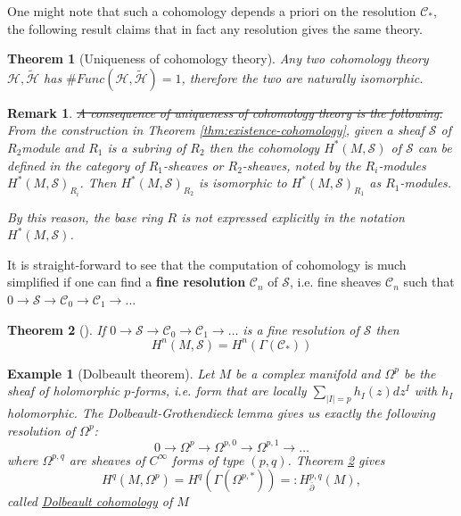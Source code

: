 \documentclass[11pt]{article}
\newtheorem{remark}{Remark}
\newtheorem{theorem}{Theorem}
\newtheorem{exampl}{Example}
\begin{document}
One might note that such a cohomology depends a priori on the resolution \(\mathcal{C}_*\), the following result claims that in fact any resolution gives the same theory.

\begin{theorem}[Uniqueness of cohomology theory]
\label{thm:uniqueness-cohomology}
Any two cohomology theory \(\mathcal{H}, \tilde{\mathcal{H}}\) has \(\#Func(\mathcal{H},
\tilde{\mathcal{H}}) =1\), therefore the two are naturally isomorphic.
\end{theorem}


\begin{remark}
\sout{A consequence of uniqueness of cohomology theory is the following.} From the construction
in Theorem \ref{thm:existence-cohomology}, given a sheaf \(\mathcal{S}\) of \(R_2\)module and \(R_1\) is a subring of \(R_2\) then the
cohomology \(H^*(M, \mathcal{S})\) of \(\mathcal{S}\) can be defined in the category
of \(R_1\)-sheaves or \(R_2\)-sheaves, noted by the \(R_i\)-modules \(H^*(M,
\mathcal{S})_{R_i}\). Then \(H^*(M, \mathcal{S})_{R_2}\) is isomorphic to \(H^*(M,
\mathcal{S})_{R_1}\) as \(R_1\)-modules.

By this reason, the base ring \(R\) is not expressed explicitly in the notation \(H^*(M, \mathcal{S})\).
\end{remark}


It is straight-forward to see that the computation of cohomology is much simplified if one
can find a \textbf{fine resolution} \(\mathcal{C}_n\) of \(\mathcal{S}\), i.e. fine sheaves
\(\mathcal{C}_n\) such that \(0 \longrightarrow \mathcal{S}\longrightarrow
\mathcal{C}_0 \longrightarrow \mathcal{C}_1 \longrightarrow \dots\)

\begin{theorem}[]
\label{thm:fine-resolution}
If  \(0 \longrightarrow \mathcal{S}\longrightarrow
\mathcal{C}_0 \longrightarrow \mathcal{C}_1 \longrightarrow \dots\) is a fine resolution
of \(\mathcal{S}\) then
\[
H^n(M, \mathcal{S}) = H^n(\Gamma(\mathcal{C}_*))
\]
\end{theorem}

\begin{exampl}[Dolbeault theorem]
Let \(M\) be a complex manifold and \(\Omega^p\) be the sheaf of holomorphic \(p\)-forms, i.e. form that are locally \(\sum_{|I|=p} h_I(z)dz^I\) with \(h_I\)
holomorphic. The Dolbeault-Grothendieck lemma gives us exactly the following resolution of
\(\Omega^p\): \[ 0 \longrightarrow \Omega^p \longrightarrow \Omega^{p,0} \longrightarrow
\Omega^{p,1} \longrightarrow \dots \] where \(\Omega^{p,q}\) are sheaves of \(C^\infty\) forms of type \((p,q)\). Theorem \ref{thm:fine-resolution} gives \[ H^q(M,\Omega^p) =
H^q(\Gamma(\Omega^{p,*})) =: H^{p,q}_{\bar \partial}(M), \] called \uline{Dolbeault cohomology} of
\(M\)
\end{exampl}
\end{document}
